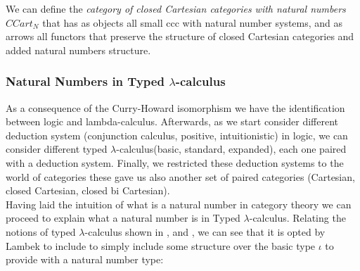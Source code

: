 \begin{definition}
  We can define the \emph{category of closed Cartesian categories with natural numbers} $CCart_N$ that has as objects all small ccc with natural number systems, and as arrows all functors that preserve the structure of closed Cartesian categories and added natural numbers structure.\\
\end{definition}


\subsubsection{Natural Numbers in Typed $\lambda$-calculus}\label{section:natural-revisited}

As a consequence of the Curry-Howard isomorphism we have the identification between logic and lambda-calculus. Afterwards, as we start consider different deduction system  (conjunction calculus, positive, intuitionistic) in logic, we can consider different typed $\lambda$-calculus(basic, standard, expanded), each one paired with a deduction system. Finally, we restricted these deduction systems to the world of categories these gave us also another set of paired categories (Cartesian, closed Cartesian, closed bi Cartesian). \\



Having laid the intuition of what is a natural number in category theory we can proceed to explain what a natural number is in Typed $\lambda$-calculus. Relating the notions of typed $\lambda$-calculus shown in \cite[Section 10]{lambek1988introduction}, \cite[Section 6]{selinger2008lecture} and \cite[Section 10]{cardone2006history}, we can see that it is opted by Lambek to include to simply include some structure over the basic type $\iota$  to provide with a natural number type:

